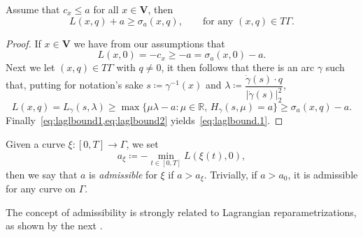 \documentclass[11pt,a4paper,american]{article}
\newcommand{\Rds}{\mathds R}
\newcommand{\Vbf}{\mathbf V}
\begin{document}
    \begin{lem}\label{laglbound}
        Assume that $c_x\le a$ for all $x\in\Vbf$, then
        \begin{equation}\label{eq:laglbound.1}
            L(x,q)+a\ge\sigma_a(x,q),\qquad\text{for any }(x,q)\in T\Gamma.
        \end{equation}
    \end{lem}
    \begin{proof}
        If $x\in\Vbf$ we have from our assumptions that
        \begin{equation}\label{eq:laglbound1}
            L(x,0)=-c_x\ge-a=\sigma_a(x,0)-a.
        \end{equation}
        Next we let $(x,q)\in T\Gamma$ with $q\ne0$, it then follows that there is an arc $\gamma$ such that, putting for notation's sake $s\coloneqq\gamma^{-1}(x)$ and $\lambda\coloneqq\dfrac{\dot\gamma(s)\cdot q}{|\dot\gamma(s)|_2^2}$,
        \begin{equation}\label{eq:laglbound2}
            L(x,q)=L_\gamma(s,\lambda)\ge\max\{\mu\lambda-a:\mu\in\Rds,\,H_\gamma(s,\mu)=a\}\ge\sigma_a(x,q)-a.
        \end{equation}
        Finally~\cref{eq:laglbound1,eq:laglbound2} yields~\cref{eq:laglbound.1}.
    \end{proof}

    \begin{defin}\label{admisdef}
        Given a curve $\xi:[0,T]\to\Gamma$, we set
        \begin{equation*}
            a_\xi\coloneqq-\min_{t\in[0,T]}L(\xi(t),0),
        \end{equation*}
        then we say that $a$ is \emph{admissible} for $\xi$ if $a>a_\xi$. Trivially, if $a>a_0$, it is admissible for any curve on $\Gamma$.
    \end{defin}

    The concept of admissibility is strongly related to Lagrangian reparametrizations, as shown by the next .
\end{document}
